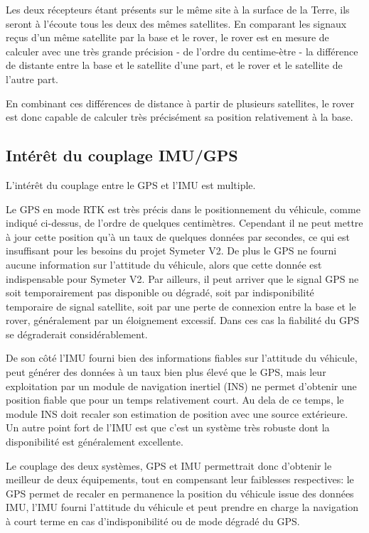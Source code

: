 \documentclass[12pt,a4paper]{report}
\begin{document}
		\para Les deux récepteurs étant présents sur le même site à la surface de la Terre, ils seront à l'écoute tous les deux des mêmes satellites. En comparant les signaux reçus d'un même satellite par la base et le rover, le rover est en mesure de calculer avec une très grande précision - de l'ordre du centime-ètre - la différence de distante entre la base et le satellite d'une part, et le rover et le satellite de l'autre part. 
		

		\para En combinant ces différences de distance à partir de plusieurs satellites, le rover est donc capable de calculer très précisément sa position relativement à la base.
		
		\subsection{Intérêt du couplage IMU/GPS}
		L'intérêt du couplage entre le GPS et l'IMU est multiple.
		
		\para Le GPS en mode RTK est très précis dans le positionnement du véhicule, comme indiqué ci-dessus, de l'ordre de quelques centimètres. Cependant il ne peut mettre à jour cette position qu'à un taux de quelques données par secondes, ce qui est insuffisant pour les besoins du projet Symeter V2. De plus le GPS ne fourni aucune information sur l'attitude du véhicule, alors que cette donnée est indispensable pour Symeter V2. Par ailleurs, il peut arriver que le signal GPS ne soit temporairement pas disponible ou dégradé, soit par indisponibilité temporaire de signal satellite, soit par une perte de connexion entre la base et le rover, généralement par un éloignement excessif. Dans ces cas la fiabilité du GPS se dégraderait considérablement.
		
		\para De son côté l'IMU fourni bien des informations fiables sur l'attitude du véhicule, peut générer des données à un taux bien plus élevé que le GPS, mais leur exploitation par un module de navigation inertiel (INS) ne permet d'obtenir une position fiable que pour un temps relativement court. Au dela de ce temps, le module INS doit recaler son estimation de position avec une source extérieure. Un autre point fort de l'IMU est que c'est un système très robuste dont la disponibilité est généralement excellente.
		
		\para Le couplage des deux systèmes, GPS et IMU permettrait donc d'obtenir le meilleur de deux équipements, tout en compensant leur faiblesses respectives: le GPS permet de recaler en permanence la position du véhicule issue des données IMU, l'IMU fourni l'attitude du véhicule et peut prendre en charge la navigation à court terme en cas d'indisponibilité ou de mode dégradé du GPS.
	
\end{document}
